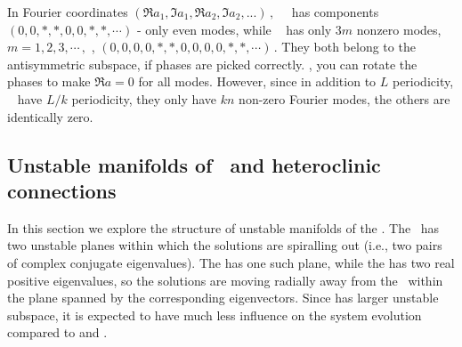 In Fourier coordinates
\(
(\Re a_1, \Im a_1, \Re a_2, \Im a_2, ...)
\,,
\)
 ~\eqv\ has components \(
(0, 0, *, *, 0, 0, *, *,\cdots)
\) - only even modes, while ~{\eqv}
has only $3m$ nonzero modes,
\(
m = 1, 2, 3, \cdots\,,
\)
\ie,
\(
(0,0,0,0,*,*,0,0,0,0,*,*,\cdots)
\,.
\)
They both belong to the antisymmetric subspace, if phases are picked
correctly.
\ie,
you can rotate the phases to make
\( \Re a = 0 \)
for all modes. However,
since in addition to
$L$ periodicity, ~{\eqva} have
$L/k$ periodicity, they only have
$kn$ non-zero Fourier modes, the others are identically zero.


\subsection{Unstable manifolds of \eqva\ and heteroclinic
connections}

In this section we explore the structure of unstable
manifolds of the {\eqva}.  The  \eqv\ has two unstable
planes within which the solutions are spiralling out (i.e., two
pairs of complex conjugate eigenvalues).  The  has one such plane,
while the  has two real positive eigenvalues, so the solutions are
moving radially away from the \eqv\ within the plane spanned
by the corresponding eigenvectors.  Since  has larger unstable
subspace, it is expected to have much less influence on the system
evolution compared to  and .

